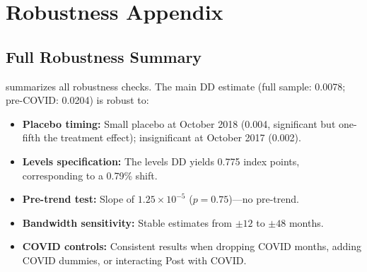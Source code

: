 \documentclass[12pt]{article}
\begin{document}
\section{Robustness Appendix}
\label{app:robustness}

\subsection{Full Robustness Summary}

 summarizes all robustness checks. The main DD estimate (full sample: 0.0078; pre-COVID: 0.0204) is robust to:

\begin{itemize}
\item \textbf{Placebo timing:} Small placebo at October 2018 (0.004, significant but one-fifth the treatment effect); insignificant at October 2017 (0.002).
\item \textbf{Levels specification:} The levels DD yields 0.775 index points, corresponding to a 0.79\% shift.
\item \textbf{Pre-trend test:} Slope of $1.25 \times 10^{-5}$ ($p = 0.75$)---no pre-trend.
\item \textbf{Bandwidth sensitivity:} Stable estimates from $\pm12$ to $\pm48$ months.
\item \textbf{COVID controls:} Consistent results when dropping COVID months, adding COVID dummies, or interacting Post with COVID.
\end{itemize}
\end{document}
